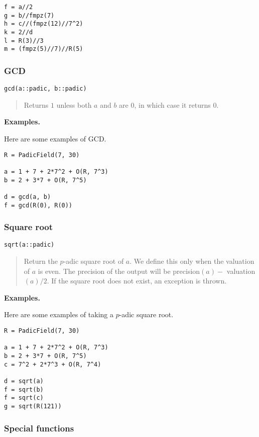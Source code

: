 \documentclass[a4paper,10pt]{article}
\newcommand{\desc}[1]{\vspace{-3mm}\begin{quote}#1\end{quote}}
\begin{document}
{{\begin{lstlisting}
f = a//2
g = b//fmpz(7)
h = c//(fmpz(12)//7^2)
k = 2//d
l = R(3)//3
m = (fmpz(5)//7)//R(5)
\end{lstlisting}

\subsubsection{GCD}

\begin{lstlisting}
gcd(a::padic, b::padic)
\end{lstlisting}

\desc{Returns $1$ unless both $a$ and $b$ are $0$, in which case it returns $0$.}

\textbf{Examples.}

Here are some examples of GCD.

\begin{lstlisting}
R = PadicField(7, 30)

a = 1 + 7 + 2*7^2 + O(R, 7^3)
b = 2 + 3*7 + O(R, 7^5)

d = gcd(a, b)
f = gcd(R(0), R(0))
\end{lstlisting}

\subsubsection{Square root}

\begin{lstlisting}
sqrt(a::padic)
\end{lstlisting}

\desc{Return the $p$-adic square root of $a$. We define this only when the
valuation of $a$ is even. The precision of the output will be precision$(a) -$
valuation$(a)/2$. If the square root does not exist, an exception is thrown.}

\textbf{Examples.}

Here are some examples of taking a $p$-adic square root.

\begin{lstlisting}
R = PadicField(7, 30)

a = 1 + 7 + 2*7^2 + O(R, 7^3)
b = 2 + 3*7 + O(R, 7^5)
c = 7^2 + 2*7^3 + O(R, 7^4)

d = sqrt(a)
f = sqrt(b)
f = sqrt(c)
g = sqrt(R(121))
\end{lstlisting}

\subsubsection{Special functions}

}}
\end{document}
